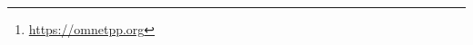 \begin{abstract}
	This project has been developed as a workgroup for the course of
	\theclass{} (\thecourse, \theinstitute). The aim of this project is to
	give a demonstration of the students' capabilities to build up a
	simulator with \omnetpp\footnote{\url{https://omnetpp.org}} for the
	\thetitle{} problem defined in  and analyze the
	results in order to optimize the performance of the network.
\end{abstract}
